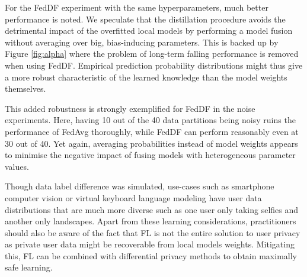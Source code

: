 \documentclass{article}
\begin{document}
For the FedDF experiment with the same hyperparameters, much better performance is noted.
We speculate that the distillation procedure avoids the detrimental impact of the overfitted local models by performing a model fusion without averaging over big, bias-inducing parameters.
This is backed up by Figure \ref{fig:alpha} where the problem of long-term falling performance is removed when using FedDF.
Empirical prediction probability distributions might thus give a more robust characteristic of the learned knowledge than the model weights themselves.

This added robustness is strongly exemplified for FedDF in the noise experiments.
Here, having 10 out of the 40 data partitions being noisy ruins the performance of FedAvg thoroughly, while FedDF can perform reasonably even at 30 out of 40.
Yet again, averaging probabilities instead of model weights appears to minimise the negative impact of fusing models with heterogeneous parameter values.



Though data label difference was simulated, use-cases such as smartphone computer vision or virtual keyboard language modeling have user data distributions that are much more diverse such as one user only taking selfies and another only landscapes.
Apart from these learning considerations, practitioners should also be aware of the fact that FL is not the entire solution to user privacy as private user data might be recoverable from local models weights.
Mitigating this, FL can be combined with differential privacy methods \cite{xiong2020ldp} to obtain maximally safe learning.
\end{document}
